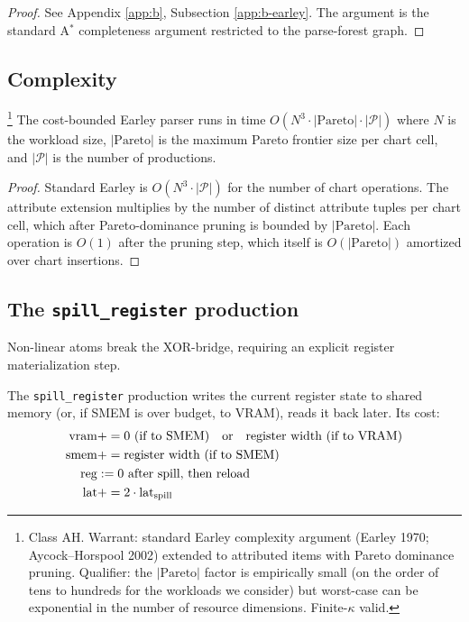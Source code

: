 \begin{proof}
  See Appendix \ref{app:b}, Subsection
  \ref{app:b-earley}. The argument is the standard
  A$^*$ completeness argument restricted to the
  parse-forest graph.
\end{proof}

\subsection{Complexity}

\begin{theorem}\label{thm:complexity}
  \footnote{Class \textsf{AH}. Warrant:
  standard Earley complexity argument (Earley 1970;
  Aycock--Horspool 2002) extended to attributed
  items with Pareto dominance pruning. Qualifier:
  the $|\mathrm{Pareto}|$ factor is empirically
  small (on the order of tens to hundreds for the
  workloads we consider) but worst-case can be
  exponential in the number of resource dimensions.
  Finite-$\kappa$ valid.}
  The cost-bounded Earley parser runs in time
  $O(N^3 \cdot |\mathrm{Pareto}| \cdot |\mathcal{P}|)$
  where $N$ is the workload size, $|\mathrm{Pareto}|$
  is the maximum Pareto frontier size per chart cell,
  and $|\mathcal{P}|$ is the number of productions.
\end{theorem}

\begin{proof}
  Standard Earley is $O(N^3 \cdot |\mathcal{P}|)$ for
  the number of chart operations. The attribute
  extension multiplies by the number of distinct
  attribute tuples per chart cell, which after
  Pareto-dominance pruning is bounded by
  $|\mathrm{Pareto}|$. Each operation is $O(1)$
  after the pruning step, which itself is $O(|\mathrm{Pareto}|)$
  amortized over chart insertions.
\end{proof}

\subsection{The \texttt{spill\_register} production}

Non-linear atoms break the XOR-bridge, requiring an
explicit register materialization step.

\begin{definition}
  \label{def:spill}
  The \texttt{spill\_register} production writes the
  current register state to shared memory (or, if
  SMEM is over budget, to VRAM), reads it back
  later. Its cost:
  \begin{align}
    \operatorname{vram} &+= 0 \text{ (if to SMEM)}
          \quad \text{or} \quad
          \text{register width} \text{ (if to VRAM)} \\
    \operatorname{smem} &+= \text{register width (if to SMEM)} \\
    \operatorname{reg}  &:= 0 \text{ after spill, then reload} \\
    \operatorname{lat}  &+= 2 \cdot \operatorname{lat}_{\mathrm{spill}}
  \end{align}
\end{definition}

